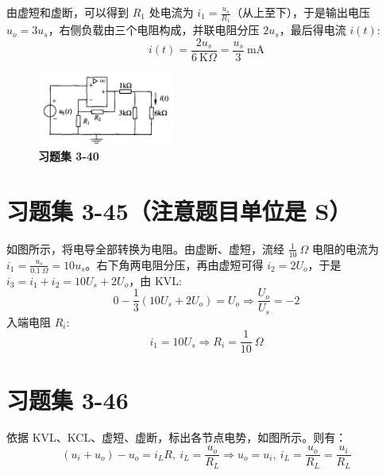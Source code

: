 \documentclass[UTF8]{report}
\def\mA{\ \mathrm{mA}}
\def\KO{\ \mathrm{K}\Omega}
\theoremstyle{MyLineTheoremStyle} %
\theoremstyle{MyBlockTheoremStyle} %
\theoremstyle{MySubsubsectionStyle} %
\begin{document}
由虚短和虚断，可以得到 $R_1$ 处电流为 $i_1 = \frac{u_s}{R_1}$（从上至下），于是输出电压 $u_o = 3u_s$，右侧负载由三个电阻构成，并联电阻分压 $2u_s$，最后得电流 $i(t)$:
\begin{equation}
i(t) = \frac{2u_s}{6 \KO} = \frac{u_s}{3} \mA
\end{equation}

\begin{figure}[H]\centering
\includegraphics[width=0.4\textwidth]{assets/3/3-40.jpg}
\caption{\bfseries 习题集 3-40}
\end{figure}

\section{习题集 3-45（注意题目单位是 S）}

如图所示，将电导全部转换为电阻。由虚断、虚短，流经 $\frac{1}{10}\ \Omega$ 电阻的电流为 $i_1 = \frac{u_s}{0.1\ \Omega} = 10u_s$。右下角两电阻分压，再由虚短可得 $i_2 = 2U_o$，于是 $i_3 = i_1 + i_2 = 10 U_s + 2U_o$，由 KVL:
\begin{equation}
0 - \frac{1}{3}(10 U_s + 2U_o) = U_o \Longrightarrow  \frac{U_o}{U_s} = -2
\end{equation}
入端电阻 $R_i$: 
\begin{equation}
    i_1 = 10U_s \Longrightarrow  R_i = \frac{1}{10}\ \Omega
\end{equation}

\section{习题集 3-46}

依据 KVL、KCL、虚短、虚断，标出各节点电势，如图所示。则有：
\begin{equation}
(u_i+u_o)-u_o = i_LR,\ i_L = \frac{u_o}{R_L} \Longrightarrow u_o = u_i,\ i_L = \frac{u_o}{R_L} = \frac{u_i}{R_L}
\end{equation}
\end{document}
